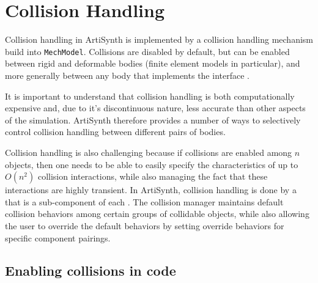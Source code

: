 


\section{Collision Handling}
\label{sec:mechii:collisions}

Collision handling in ArtiSynth is implemented by a collision
handling mechanism build into {\tt MechModel}. Collisions are
disabled by default, but can be enabled between rigid and deformable
bodies (finite element models in particular), and more generally
between any body that implements the interface 
.

It is important to understand that collision handling is both
computationally expensive and, due to it's discontinuous nature, less
accurate than other aspects of the simulation.  ArtiSynth therefore
provides a number of ways to selectively control collision handling
between different pairs of bodies.

Collision handling is also challenging because if collisions are
enabled among $n$ objects, then one needs to be able to easily specify
the characteristics of up to $O(n^2)$ collision interactions, while
also managing the fact that these interactions are highly transient.
In ArtiSynth, collision handling is done by a
 that is a
sub-component of each
.  The collision
manager maintains default collision behaviors among certain groups of
collidable objects, while also allowing the user to override the
default behaviors by setting override behaviors for specific component
pairings.


\subsection{Enabling collisions in code}

